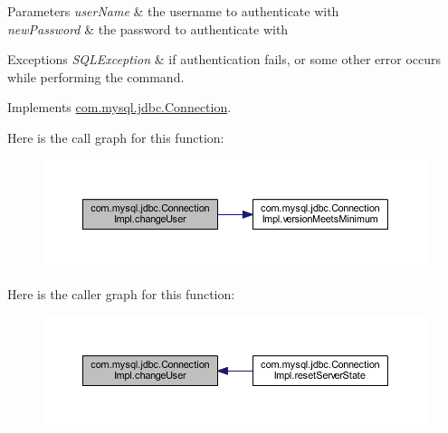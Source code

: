 \begin{DoxyParams}{Parameters}
{\em user\+Name} & the username to authenticate with \\
\hline
{\em new\+Password} & the password to authenticate with \\
\hline
\end{DoxyParams}

\begin{DoxyExceptions}{Exceptions}
{\em S\+Q\+L\+Exception} & if authentication fails, or some other error occurs while performing the command. \\
\hline
\end{DoxyExceptions}


Implements \mbox{\hyperlink{interfacecom_1_1mysql_1_1jdbc_1_1_connection_a6a6160ecb2c19b5f246450ba9252907d}{com.\+mysql.\+jdbc.\+Connection}}.

Here is the call graph for this function\+:\nopagebreak
\begin{figure}[H]
\begin{center}
\leavevmode
\includegraphics[width=350pt]{classcom_1_1mysql_1_1jdbc_1_1_connection_impl_a60c2e281bd048fd455dcd75f2c968c27_cgraph}
\end{center}
\end{figure}
Here is the caller graph for this function\+:\nopagebreak
\begin{figure}[H]
\begin{center}
\leavevmode
\includegraphics[width=350pt]{classcom_1_1mysql_1_1jdbc_1_1_connection_impl_a60c2e281bd048fd455dcd75f2c968c27_icgraph}
\end{center}
\end{figure}
\mbox{\label{classcom_1_1mysql_1_1jdbc_1_1_connection_impl_a1cd4a72947af16ecd5e7fd7d53a4e368}} 
